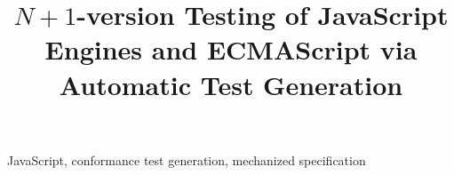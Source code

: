 \documentclass[10pt,conference]{IEEEtran}
\begin{document}
\title{$N\!+\!1$-version Testing of JavaScript Engines and ECMAScript
via Automatic Test Generation
}

\author{
}

% 
% 
% 
% 
% 
% 

\maketitle



\begin{IEEEkeywords}
JavaScript, conformance test generation, mechanized specification
\end{IEEEkeywords}










\end{document}
